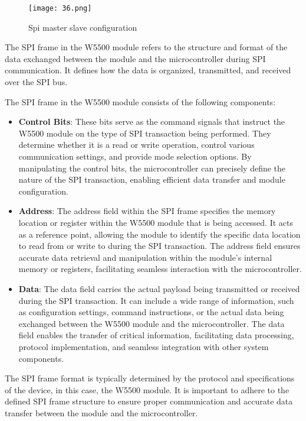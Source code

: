\documentclass[
12pt,
oneside, 
onehalfspacing, 
nolistspacing, 
parskip, 
chapterinoneline, 
]{AASTCOMPUTER}
\begin{document}
\begin{figure}[!ht]
\centering
\texttt{[image: 36.png]}
\caption[Spi master slave configuration]{Spi master slave configuration}
\label{fig:TCU}
\end{figure}


The SPI frame in the W5500 module refers to the structure and format of the data exchanged between the module and the microcontroller during SPI communication. It defines how the data is organized, transmitted, and received over the SPI bus.

The SPI frame in the W5500 module consists of the following components:
\begin{itemize}
    \item \textbf{Control Bits}: These bits serve as the command signals that instruct the W5500 module on the type of SPI transaction being performed. They determine whether it is a read or write operation, control various communication settings, and provide mode selection options. By manipulating the control bits, the microcontroller can precisely define the nature of the SPI transaction, enabling efficient data transfer and module configuration.
    \item \textbf{Address}: The address field within the SPI frame specifies the memory location or register within the W5500 module that is being accessed. It acts as a reference point, allowing the module to identify the specific data location to read from or write to during the SPI transaction. The address field ensures accurate data retrieval and manipulation within the module's internal memory or registers, facilitating seamless interaction with the microcontroller.
    \item \textbf{Data}: The data field carries the actual payload being transmitted or received during the SPI transaction. It can include a wide range of information, such as configuration settings, command instructions, or the actual data being exchanged between the W5500 module and the microcontroller. The data field enables the transfer of critical information, facilitating data processing, protocol implementation, and seamless integration with other system components.
\end{itemize}

The SPI frame format is typically determined by the protocol and specifications of the device, in this case, the W5500 module. It is important to adhere to the defined SPI frame structure to ensure proper communication and accurate data transfer between the module and the microcontroller.
\end{document}
